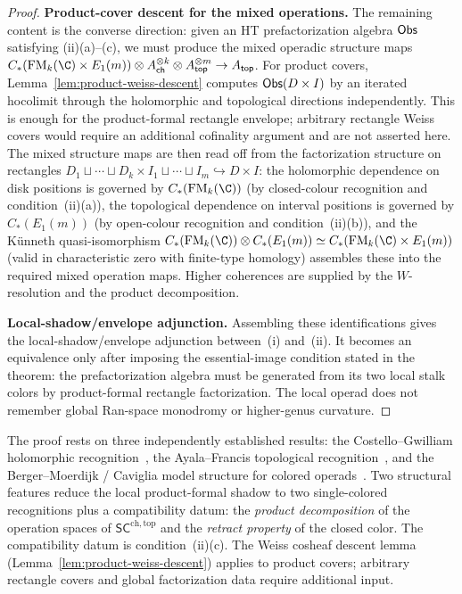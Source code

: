 \begin{proof}
\medskip\noindent
\textbf{Product-cover descent for the mixed operations.}
The remaining content is the converse direction: given an HT
prefactorization algebra $\mathsf{Obs}$ satisfying (ii)(a)--(c), we must
produce the mixed operadic structure maps
$C_\ast(\FM_k(\C) \times E_1(m)) \otimes A_{\mathsf{ch}}^{\otimes k}
\otimes A_{\mathsf{top}}^{\otimes m} \to A_{\mathsf{top}}$.
For product covers, Lemma~\ref{lem:product-weiss-descent} computes
$\mathsf{Obs}(D\times I)$ by an iterated hocolimit through the holomorphic
and topological directions independently. This is enough for the
product-formal rectangle envelope; arbitrary rectangle Weiss covers
would require an additional cofinality argument and are not asserted
here.
The mixed structure maps are then read off from the factorization
structure on rectangles $D_1 \sqcup \cdots \sqcup D_k \times
I_1 \sqcup \cdots \sqcup I_m \hookrightarrow D \times I$:
the holomorphic dependence on disk positions is governed by
$C_\ast(\FM_k(\C))$ (by closed-colour recognition and condition~(ii)(a)),
the topological dependence on interval positions is governed by
$C_\ast(E_1(m))$ (by open-colour recognition and condition~(ii)(b)),
and the K\"unneth quasi-isomorphism
$C_\ast(\FM_k(\C)) \otimes C_\ast(E_1(m)) \simeq
C_\ast(\FM_k(\C) \times E_1(m))$
(valid in characteristic zero with finite-type homology)
assembles these into the required mixed operation maps.
Higher coherences are supplied by the $W$-resolution and the product decomposition.

\medskip\noindent
\textbf{Local-shadow/envelope adjunction.}
Assembling these identifications gives the local-shadow/envelope adjunction
between~(i) and~(ii). It becomes an equivalence only after imposing
the essential-image condition stated in the theorem: the
prefactorization algebra must be generated from its two local stalk
colors by product-formal rectangle factorization. The local operad
does not remember global Ran-space monodromy or higher-genus
curvature.\qedhere
\end{proof}

\begin{remark}
\label{rmk:recognition-proof-structure}
The proof rests on three independently established results: the
Costello--Gwilliam holomorphic recognition~\cite{CG17}, the
Ayala--Francis topological recognition~\cite{AF15}, and the
Berger--Moerdijk / Caviglia model structure for colored
operads~\cite{BM03,CM14}. Two structural features reduce
the local product-formal shadow to two single-colored
recognitions plus a compatibility datum: the
\emph{product decomposition} of the operation spaces of
$\mathsf{SC}^{\mathrm{ch,top}}$ and the \emph{retract
property} of the closed color. The compatibility datum
is condition~(ii)(c). The Weiss cosheaf descent lemma
(Lemma~\ref{lem:product-weiss-descent}) applies to product covers;
arbitrary rectangle covers and global factorization data require
additional input.
\end{remark}


